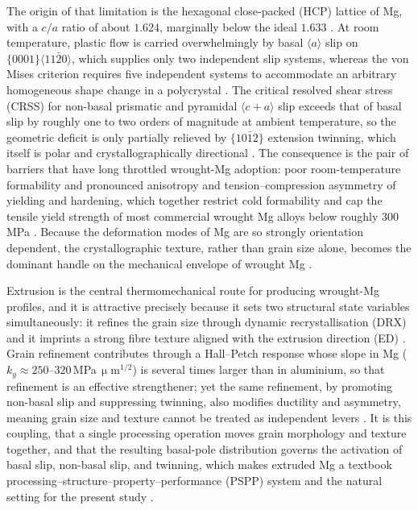\documentclass[preprint,12pt]{elsarticle}
\begin{document}
The origin of that limitation is the hexagonal close-packed (HCP) lattice of Mg, with a $c/a$ ratio of about $1.624$, marginally below the ideal $1.633$ \cite{Agnew-Review-Mg-2006}. At room temperature, plastic flow is carried overwhelmingly by basal $\langle a\rangle$ slip on $\{0001\}\langle 11\bar{2}0\rangle$, which supplies only two independent slip systems, whereas the von Mises criterion requires five independent systems to accommodate an arbitrary homogeneous shape change in a polycrystal \cite{Tariq2026,Britton}. The critical resolved shear stress (CRSS) for non-basal prismatic and pyramidal $\langle c+a\rangle$ slip exceeds that of basal slip by roughly one to two orders of magnitude at ambient temperature, so the geometric deficit is only partially relieved by $\{10\bar{1}2\}$ extension twinning, which itself is polar and crystallographically directional \cite{Chapuis-Driver-2011,Agnew-Review-Mg-2006, WANG2019155}. The consequence is the pair of barriers that have long throttled wrought-Mg adoption: poor room-temperature formability and pronounced anisotropy and tension--compression asymmetry of yielding and hardening, which together restrict cold formability and cap the tensile yield strength of most commercial wrought Mg alloys below roughly $300$\,MPa \cite{AZ31-extrusion-texture,Mg-yield-anisotropy-comparative,Agnew-Review-Mg-2006,WANG2019155}. Because the deformation modes of Mg are so strongly orientation dependent, the crystallographic texture, rather than grain size alone, becomes the dominant handle on the mechanical envelope of wrought Mg \cite{Mg-yield-anisotropy-comparative,Agnew-Review-Mg-2006, Guru2025}. 

Extrusion is the central thermomechanical route for producing wrought-Mg profiles, and it is attractive precisely because it sets two structural state variables simultaneously: it refines the grain size through dynamic recrystallisation (DRX) and it imprints a strong fibre texture aligned with the extrusion direction (ED) \cite{AZ31-extrusion-texture}. Grain refinement contributes through a Hall--Petch response whose slope in Mg ($k_y \approx 250$--$320$\,MPa\,$\upmu$m$^{1/2}$) is several times larger than in aluminium, so that refinement is an effective strengthener; yet the same refinement, by promoting non-basal slip and suppressing twinning, also modifies ductility and asymmetry, meaning grain size and texture cannot be treated as independent levers \cite{Mg-HallPetch-Review,GrainSize-Mg-RandomTexture,GrainSize-Mg-Texture-Interaction}. It is this coupling, that a single processing operation moves grain morphology and texture together, and that the resulting basal-pole distribution governs the activation of basal slip, non-basal slip, and twinning, which makes extruded Mg a textbook processing--structure--property--performance (PSPP) system and the natural setting for the present study \cite{Guru2025}.
\end{document}
